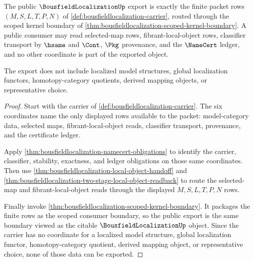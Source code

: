 \begin{theorem}
\label{thm:bousfieldlocalization-public-export}
The public $\BousfieldLocalizationUp$ export is exactly the finite packet rows
$(M,S,L,T,P,N)$ of \autoref{def:bousfieldlocalization-carrier}, routed through
the scoped kernel boundary of
\autoref{thm:bousfieldlocalization-scoped-kernel-boundary}. A public consumer
may read selected-map rows, fibrant-local-object rows, classifier transport by
$\hsame$ and $\Cont$, $\Pkg$ provenance, and the $\NameCert$ ledger, and no
other coordinate is part of the exported object.

The export does not include localized model structures, global localization
functors, homotopy-category quotients, derived mapping objects, or representative
choice.
\end{theorem}
\begin{proof}
Start with the carrier of \autoref{def:bousfieldlocalization-carrier}. The six
coordinates name the only displayed rows available to the packet: model-category
data, selected maps, fibrant-local-object reads, classifier transport,
provenance, and the certificate ledger.

Apply \autoref{thm:bousfieldlocalization-namecert-obligations} to identify the
carrier, classifier, stability, exactness, and ledger obligations on those same
coordinates. Then use \autoref{thm:bousfieldlocalization-local-object-handoff}
and \autoref{thm:bousfieldlocalization-two-stage-local-object-readback} to route
the selected-map and fibrant-local-object reads through the displayed
$M,S,L,T,P,N$ rows.

Finally invoke \autoref{thm:bousfieldlocalization-scoped-kernel-boundary}. It
packages the finite rows as the scoped consumer boundary, so the public export is
the same boundary viewed as the citable $\BousfieldLocalizationUp$ object. Since
the carrier has no coordinate for a localized model structure, global
localization functor, homotopy-category quotient, derived mapping object, or
representative choice, none of those data can be exported.
\end{proof}

